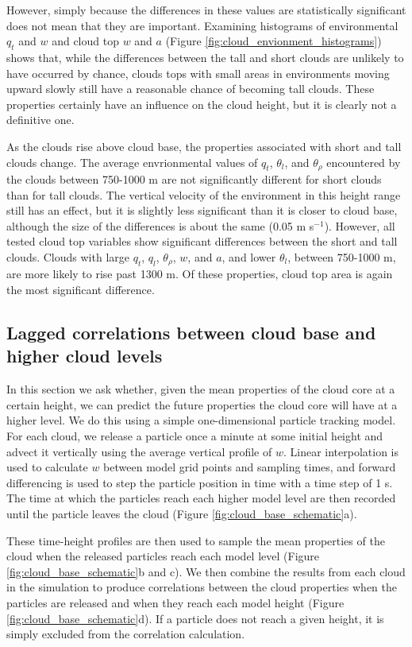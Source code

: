 \documentclass[acp]{copernicus}
\begin{document}
However, simply because the differences in these values are statistically 
significant does not mean that they are important.  Examining histograms of 
environmental $q_t$ and $w$ and cloud top $w$ and $a$ (Figure 
\ref{fig:cloud_envionment_histograms}) shows that, while the differences 
between the tall and short clouds are unlikely to have occurred by chance, 
clouds tops with small areas in environments moving upward slowly still have 
a reasonable chance of becoming tall clouds.  These properties certainly have 
an influence on the cloud height, but it is clearly not a definitive one.

As the clouds rise above cloud base, the properties associated with short and 
tall clouds change.  The average envrionmental values of $q_t$, $\theta_l$, 
and $\theta_\rho$ encountered by the clouds between 750-1000 m are not 
significantly different for short clouds than for tall clouds.  The vertical 
velocity of the environment in this height range still has an effect, but it 
is slightly less significant than it is closer to cloud base, although the 
size of the differences is about the same (0.05 m s$^{-1}$).  However, all 
tested cloud top variables show significant differences between the short and 
tall clouds.  Clouds with large $q_t$, $q_l$, $\theta_\rho$, $w$, and $a$, and 
lower $\theta_l$, between 750-1000 m, are more likely to rise past 1300 m.  
Of these properties, cloud top area is again the most significant difference.

\subsection{Lagged correlations between cloud base and higher cloud levels}

In this section we ask whether, given the mean properties of the cloud core at 
a certain height, we can predict the future properties the cloud core will have 
at a higher level.  We do this using a simple one-dimensional particle tracking 
model.  For each cloud, we release a particle once a minute at some
initial height and advect it vertically using the average vertical profile of 
$w$.  Linear interpolation is used to calculate $w$ between model grid points 
and sampling times, and forward differencing is used to step the particle 
position in time with a time step of 1 s.  The time at which the particles 
reach each higher model level are then recorded until the particle leaves the 
cloud (Figure \ref{fig:cloud_base_schematic}a).  

These time-height profiles are then used to sample the mean properties of the 
cloud when the released particles reach each model level (Figure 
\ref{fig:cloud_base_schematic}b and c).  We then combine the results from each 
cloud in the simulation to produce correlations between the cloud properties 
when the particles are released and when they reach each model height (Figure 
\ref{fig:cloud_base_schematic}d).  If a particle does not reach a given
height, it is simply excluded from the correlation calculation.
\end{document}
